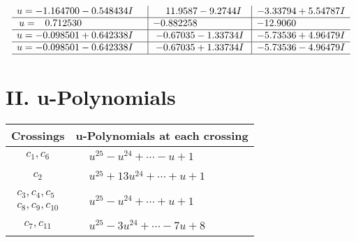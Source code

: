 \documentclass[1p]{elsarticle_modified}
\theoremstyle{definition}
\begin{document}
$$\begin{array}{c|c|c}
\begin{aligned}
u &= -1.164700 - 0.548434 I\end{aligned}
 & \phantom{-}11.9587 - 9.2744 I & -3.33794 + 5.54787 I \\ \hline\begin{aligned}
u &= \phantom{-}0.712530\phantom{ +0.000000I}\end{aligned}
 & -0.882258\phantom{ +0.000000I} & -12.9060\phantom{ +0.000000I} \\ \hline\begin{aligned}
u &= -0.098501 + 0.642338 I\end{aligned}
 & -0.67035 - 1.33734 I & -5.73536 + 4.96479 I \\ \hline\begin{aligned}
u &= -0.098501 - 0.642338 I\end{aligned}
 & -0.67035 + 1.33734 I & -5.73536 - 4.96479 I\\
 \hline 
 \end{array}$$\newpage
\newpage\renewcommand{\arraystretch}{1}
\centering \section*{ II. u-Polynomials}
\begin{tabular}{m{50pt}|m{274pt}}
Crossings & \hspace{64pt}u-Polynomials at each crossing \\
\hline $$\begin{aligned}c_{1},c_{6}\end{aligned}$$&$\begin{aligned}
&u^{25}- u^{24}+\cdots- u+1
\end{aligned}$\\
\hline $$\begin{aligned}c_{2}\end{aligned}$$&$\begin{aligned}
&u^{25}+13 u^{24}+\cdots+u+1
\end{aligned}$\\
\hline $$\begin{aligned}c_{3},c_{4},c_{5}\\c_{8},c_{9},c_{10}\end{aligned}$$&$\begin{aligned}
&u^{25}- u^{24}+\cdots+u+1
\end{aligned}$\\
\hline $$\begin{aligned}c_{7},c_{11}\end{aligned}$$&$\begin{aligned}
&u^{25}-3 u^{24}+\cdots-7 u+8
\end{aligned}$\\
\hline
\end{tabular}\newpage\renewcommand{\arraystretch}{1}
\end{document}
